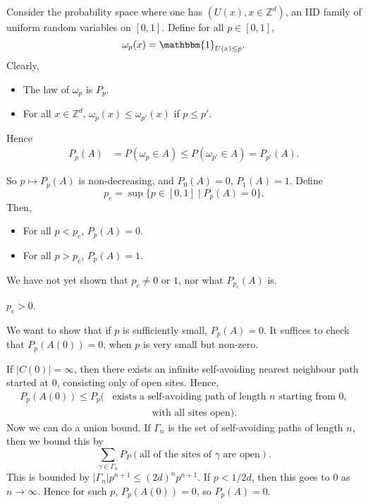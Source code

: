 \documentclass[12pt]{article}
\begin{document}
\begin{proofbox}
	Consider the probability space where one has $(U(x),  x\in \mathbb{Z}^d)$, an IID family of uniform random variables on $[0, 1]$. Define for all $p \in [0, 1]$,
	\[
	\omega_p(x) = \mathbbm{1}_{U(x) \leq p}.
	\]
	Clearly,
	\begin{itemize}
		\item The law of $\omega_p$ is $P_p$.
		\item For all $x \in \mathbb{Z}^d$, $\omega_p(x) \leq \omega_{p'}(x)$ if $p \leq p'$.
	\end{itemize}
	Hence
	\begin{align*}
		P_p(A) &= P(\omega_p \in A) \leq P(\omega_{p'} \in A) = P_{p'}(A).
	\end{align*}
\end{proofbox}

So $p \mapsto P_p(A)$ is non-decreasing, and $P_0(A) = 0$, $P_1(A) = 1$. Define
\[
	p_c = \sup\{p \in [0, 1] \mid P_p(A) = 0\}.
\]
Then,
\begin{itemize}
	\item For all $p < p_c$, $P_p(A) = 0$.
	\item For all $p > p_c$, $P_p(A) = 1$.
\end{itemize}
We have not yet shown that $p_c \neq 0$ or $1$, nor what $P_{p_c}(A)$ is.

\begin{proposition}
	$p_c > 0$.
\end{proposition}

\begin{proofbox}
	We want to show that if $p$ is sufficiently small, $P_p(A) = 0$. It suffices to check that $P_p(A(0)) = 0$, when $p$ is very small but non-zero.

	If $|C(0)| = \infty$, then there exists an infinite self-avoiding nearest neighbour path started at 0, consisting only of open sites. Hence,
	\begin{align*}
		P_p(A(0)) \leq P_p(&\text{exists a self-avoiding path of length $n$ starting from 0}, \\
&\qquad \qquad \text{with all sites open}).
	\end{align*}
	Now we can do a union bound. If $\Gamma_n$ is the set of self-avoiding paths of length $n$, then we bound this by
	\[
		\sum_{\gamma \in \Gamma_n} P_P(\text{all of the sites of $\gamma$ are open}).
	\]
	This is bounded by $|\Gamma_n| p^{n+1} \leq (2d)^{n} p^{n+1}$. If $p < 1/2d$, then this goes to $0$ as $n \to \infty$. Hence for such $p$, $P_p(A(0)) = 0$, so $P_p(A) = 0$.
\end{proofbox}
\end{document}
